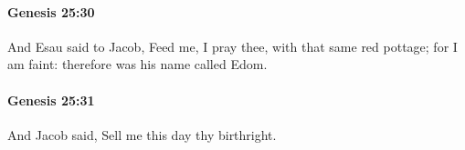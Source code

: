 		\paragraph{Genesis 25:30} %
			\label{GENESIS-25-30}

			And Esau said to Jacob, Feed me, I pray thee, with that same red pottage; for I am faint: therefore was his name called Edom.


		\paragraph{Genesis 25:31} %
			\label{GENESIS-25-31}

			And Jacob said, Sell me this day thy birthright.


